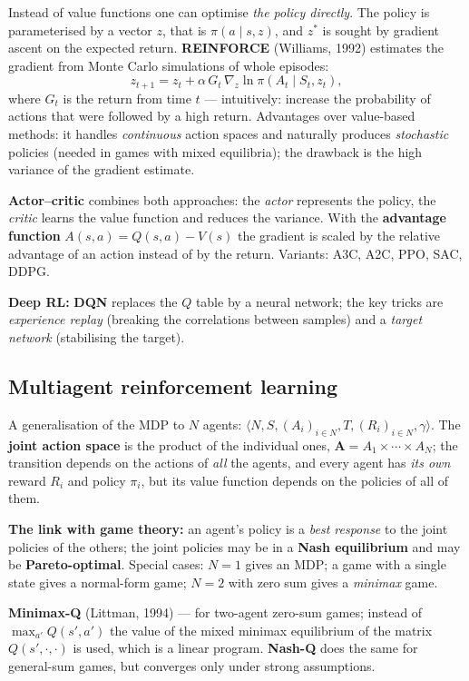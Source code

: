 \documentclass[11pt,a4paper]{article}
\theoremstyle{definition}
\begin{document}
\begin{defbox}
Instead of value functions one can optimise \emph{the policy directly}. The policy is
parameterised by a vector $z$, that is $\pi(a \mid s, z)$, and $z^*$ is sought by gradient
ascent on the expected return. \textbf{REINFORCE} (Williams, 1992) estimates the gradient from
Monte Carlo simulations of whole episodes:
\[
z_{t+1} = z_t + \alpha\, G_t\, \nabla_z \ln \pi(A_t \mid S_t, z_t),
\]
where $G_t$ is the return from time $t$ --- intuitively: increase the probability of actions
that were followed by a high return. Advantages over value-based methods: it handles
\emph{continuous} action spaces and naturally produces \emph{stochastic} policies (needed in
games with mixed equilibria); the drawback is the high variance of the gradient estimate.

\textbf{Actor--critic} combines both approaches: the \emph{actor} represents the policy, the
\emph{critic} learns the value function and reduces the variance. With the \textbf{advantage
function} $A(s,a) = Q(s,a) - V(s)$ the gradient is scaled by the relative advantage of an action
instead of by the return. Variants: A3C, A2C, PPO, SAC, DDPG.

\textbf{Deep RL:} \textbf{DQN} replaces the $Q$ table by a neural network; the key tricks are
\emph{experience replay} (breaking the correlations between samples) and a \emph{target network}
(stabilising the target).
\end{defbox}

\subsection{Multiagent reinforcement learning}

\begin{defbox}
A generalisation of the MDP to $N$ agents:
$\langle N, S, (A_i)_{i\in N}, T, (R_i)_{i \in N}, \gamma\rangle$.
The \textbf{joint action space} is the product of the individual ones,
$\mathbf{A} = A_1 \times \cdots \times A_N$; the transition depends on the actions of
\emph{all} the agents, and every agent has \emph{its own} reward $R_i$ and policy $\pi_i$, but
its value function depends on the policies of all of them.

\textbf{The link with game theory:} an agent's policy is a \emph{best response} to the joint
policies of the others; the joint policies may be in a \textbf{Nash equilibrium} and may be
\textbf{Pareto-optimal}. Special cases: $N=1$ gives an MDP; a game with a single state gives a
normal-form game; $N=2$ with zero sum gives a \emph{minimax} game.

\textbf{Minimax-Q} (Littman, 1994) --- for two-agent zero-sum games; instead of
$\max_{a'} Q(s',a')$ the value of the mixed minimax equilibrium of the matrix
$Q(s',\cdot,\cdot)$ is used, which is a linear program. \textbf{Nash-Q} does the same for
general-sum games, but converges only under strong assumptions.
\end{defbox}
\end{document}
